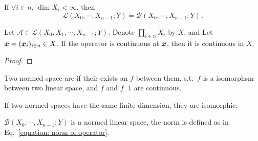 \documentclass[openany]{book}
\begin{document}
\begin{corollary}
	\label{corollary: linear operators from finite dimensional space are continuous}
	If $\forall i \in n$, $\dim X_i < \infty$, then
	\begin{equation*}
		\mathcal L(X_0, \cdots, X_{n-1}; Y) = \mathcal B(X_0, \cdots, X_{n-1}; Y)
		\,.
	\end{equation*}
\end{corollary}

\begin{corollary}\label{theorem: Continuous at a point then at everywhere}
	Let $\mathscr A \in \mathcal L(X_0, X_1, \cdots, X_{n - 1}; Y)$.
	Denote $\prod_{i \in n} X_i$ by $X$, and Let $\boldsymbol{x} = (\boldsymbol{x}_i)_{i \in n} \in X$.
	If the operator is continuous at $\boldsymbol{x}$, then it is continuous in $X$.
\end{corollary}
\begin{proof}

\end{proof}

\begin{definition}[Isomorphism]
	Two normed space are  if their exists an  $f$ between them, s.t.\ $f$ is a isomorphsm between two linear space, and $f$ and $f^-1$ are continuous.
\end{definition}

\begin{theorem}
	If two normed spaces have the same finite dimension, they are isomorphic.
\end{theorem}

\begin{theorem}\label{theorem: space of bounded linear operators is normed linear space}
	$\mathcal B(X_0, \cdots, X_{n-1}; Y)$ is a normed linear space, the norm is defined as in Eq.~\eqref{equation: norm of operator}.
\end{theorem}
\end{document}
